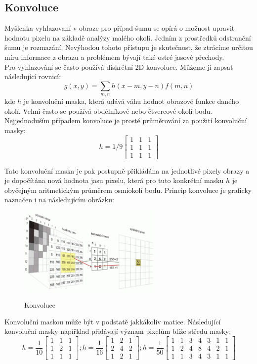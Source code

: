 \documentclass{thesis}%
\begin{document}
\subsection{Konvoluce}
Myšlenka vyhlazovaní v obraze pro případ šumu se opírá o možnost upravit hodnotu pixelu na základě analýzy malého okolí. Jedním z prostředků odstranění šumu je rozmazání. Nevýhodou tohoto přístupu je skutečnost, že ztrácíme určitou míru informace z obrazu a problémem bývají také ostré jasové přechody. \\
Pro vyhlazování se často používá diskrétní 2D konvoluce. Můžeme jí zapsat následující rovnicí:
\begin{equation}
g(x,y) = \sum_{m,n}h(x-m,y-n) f(m,n)
\end{equation}
kde $h$ je konvoluční maska, která udává váhu hodnot obrazové funkce daného okolí. Velmi často se používá obdélníkové nebo čtvercové okolí bodu. Nejjednoduším případem konvoluce je prosté průměrování za použití konvoluční masky:
$$
h = 1/9
\left[
\begin{matrix}
1&1&1\\
1&1&1\\
1&1&1
\end{matrix}
\right]
$$

 Tato konvoluční maska je pak postupně přikládána na jednotlivé pixely obrazy a je dopočítána nová hodnota jasu pixelu, která pro tuto konkrétní masku $h$ je obyčejným aritmetickým průměrem osmiokolí bodu. Princip konvoluce je graficky naznačen i na následujícím obrázku:
   \begin{figure}[htp!]
  \centering
   \includegraphics[width=7cm]{konvoluce.png}\\ 
    \caption[Konvoluce]{Konvoluce}
\end{figure}
Konvoluční maskou může být v podstatě jakkákoliv matice. Následující konvoluční masky napířklad přidávají význam pixelům blíže středu masky:
$$
h =\frac{1}{10}
\left[
\begin{matrix}
1&1&1\\
1&2&1\\
1&1&1
\end{matrix}
\right];
h =\frac{1}{16}
\left[
\begin{matrix}
1&2&1\\
2&4&2\\
1&2&1
\end{matrix}
\right];
h =\frac{1}{50}
\left[
\begin{matrix}
1&1&3&4&3&1&1\\
1&2&4&8&4&2&1\\
1&1&3&4&3&1&1
\end{matrix}
\right]
$$
\end{document}

